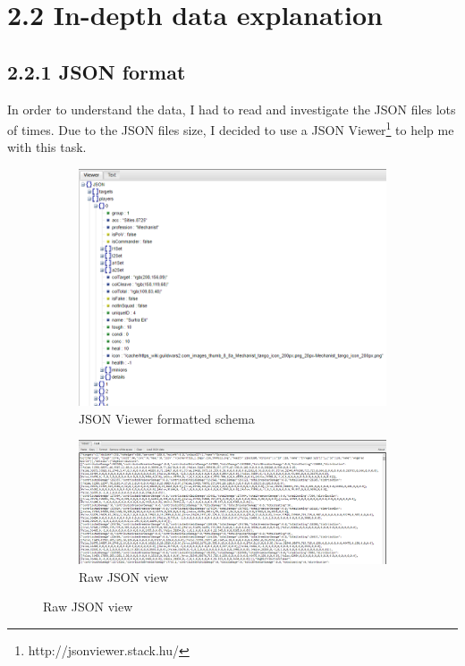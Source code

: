 \documentclass[12pt,a4paper]{article}
\begin{document}
    \newpage

    \section*{\large 2.2 In-depth data explanation}

    \subsection*{\normalsize 2.2.1 JSON format}
    In order to understand the data, I had to read and investigate the JSON files lots of times.
    Due to the JSON files size, I decided to use a JSON Viewer\footnote{http://jsonviewer.stack.hu/} 
    to help me with this task.\\

    \begin{figure}[h!]
        \centering
        \begin{subfigure}[b]{0.8\linewidth}
          \includegraphics[width=\linewidth]{Images/json_schema.png}
          \caption{JSON Viewer formatted schema}
        \end{subfigure}

        \begin{subfigure}[b]{0.8\linewidth}
          \includegraphics[width=\linewidth]{Images/json_raw.png}
          \caption{Raw JSON view}
        \end{subfigure}
    \end{figure}
\end{document}
